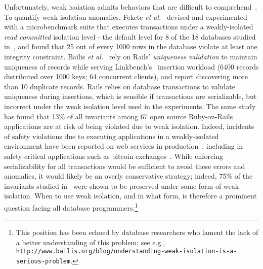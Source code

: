 Unfortunately, weak isolation admits behaviors that are difficult to
comprehend~\cite{berenson}. To quantify weak isolation anomalies,
Fekete \emph{et al.}~\cite{feketevldb09} devised and experimented with
a microbenchmark suite that executes transactions under a
weakly-isolated \emph{read committed} isolation level - the default
level for 8 of the 18 databases studied in~\cite{bailishotos}, and
found that 25 out of every 1000 rows in the database violate at least
one integrity constraint. Bailis \emph{et al.}~\cite{bailisferal} rely
on Rails' \emph{uniqueness validation} to maintain uniqueness of
records while serving Linkbench's~\cite{linkbench} insertion workload
(6400 records distributed over 1000 keys; 64 concurrent clients), and
report discovering more than 10 duplicate records.  Rails relies on
database transactions to validate uniqueness during insertions, which
is sensible if transactions are serializable, but incorrect under the
weak isolation level used in the experiments. The same study has found
that 13\% of all invariants among 67 open source Ruby-on-Rails
applications are at risk of being violated due to weak
isolation. Indeed, incidents of safety violations due to executing
applications in a weakly-isolated environment have been reported on
web services in production~\cite{starbucksbug, scimedbug}, including
in safety-critical applications such as bitcoin
exchanges~\cite{poloniexbug, bitcoinbug}. While enforcing
serializability for all transactions would be sufficient to avoid
these errors and anomalies, it would likely be an overly conservative
strategy; indeed, 75\% of the invariants studied in~\cite{bailisferal}
were shown to be preserved under some form of weak isolation.  When to
use weak isolation, and in what form, is therefore a prominent
question facing all database programmers.\footnote{This position has
been echoed by database researchers who lament the lack of a
better understanding of this problem; see e.g., {\tt
  http://www.bailis.org/blog/understanding-weak-isolation-is-a-serious-problem}.}

